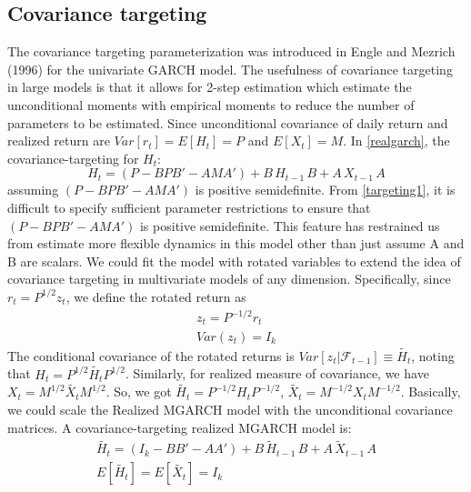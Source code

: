 \documentclass[titlepage,11pt]{article}
\begin{document}
\subsection{Covariance targeting}
The covariance targeting parameterization was introduced in Engle and Mezrich (1996) for the univariate GARCH model. The usefulness of covariance targeting in large models is that it allows for 2-step estimation which estimate the unconditional moments with empirical moments to reduce the number of parameters to be estimated.
Since unconditional covariance of daily return and realized return are $Var[r_t]=E[H_t]=P$ and $E[X_t]=M$. In \ref{realgarch}, the covariance-targeting for $H_t$:
\begin{equation}
\label{targeting1}
H_t=(P-BPB'-AMA')+ B\,  H_{t-1} \,B+A \,  X_{t-1} \, A
\end{equation}
assuming $(P-BPB'-AMA')$ is positive semidefinite. From \ref{targeting1}, it is difficult to specify sufficient parameter restrictions to ensure that $(P-BPB'-AMA')$ is positive semidefinite. This feature has restrained us from estimate more flexible dynamics in this model other than just assume A and B are scalars.
We could fit the model with rotated variables to extend the idea of covariance targeting in multivariate models of any dimension. Specifically, since $r_t = P^{1/2}z_t$, we define the rotated return as 
\begin{align}
\label{rotate}
z_t = P^{-1/2}r_t \nonumber \\
Var(z_t)=I_k
\end{align}
The conditional covariance of the rotated returns is $Var[z_t|\mathcal{F}_{t-1}]\equiv \tilde{H_t}$, noting that $H_t = P^{1/2}\tilde{H_t}P^{1/2}$. Similarly, for realized measure of covariance, we have $X_t = M^{1/2}\tilde{X_t}M^{1/2}$. So, we got $\tilde{H_t} = P^{-1/2} H_t P^{-1/2}$, $\tilde{X_t} = M^{-1/2} X_t M^{-1/2}$. Basically, we could scale the Realized MGARCH model with the unconditional covariance matrices. A covariance-targeting realized MGARCH model is:
\begin{align}
\label{targeting2}
\tilde{H_t}=(I_k-BB'-AA')+ B\,  \tilde{H}_{t-1} \,B+A \,  \tilde{X}_{t-1} \, A  \\
E[\tilde{H_t}]=E[\tilde{X_t}]=I_k \nonumber
\end{align}
\end{document}
